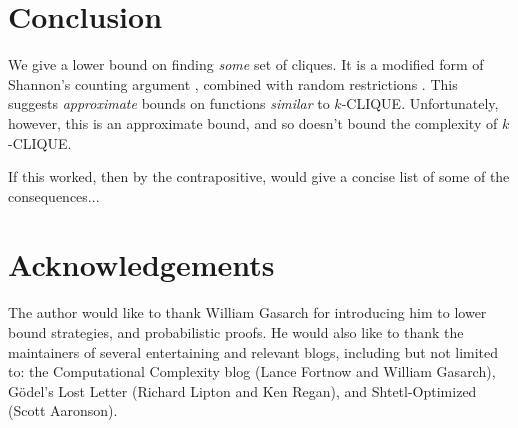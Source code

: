 \documentclass[12pt]{article}
\theoremstyle{definition}
\begin{document}
\section{Conclusion}

We give a lower bound on finding {\em some} set of cliques.
It is a modified form of Shannon's counting argument
\cite{shannon_synthesis_1949}, combined with random restrictions
\cite{subbotovskaya1963comparison} \cite{hastad1987lower}.
This suggests {\em approximate} bounds on functions {\em similar} to $k$-CLIQUE.
Unfortunately, however, this is an approximate bound,
and so doesn't bound the complexity of $k$-CLIQUE.

If this worked, then by the contrapositive,
\cite{fenner1996complexity} would give a concise list of some of the consequences...

\section{Acknowledgements}

The author would like to thank William Gasarch for introducing him
to lower bound strategies, and probabilistic proofs.
He would also like to thank the maintainers of
several entertaining and relevant blogs, including but
not limited to: the Computational Complexity blog
(Lance Fortnow and William Gasarch), 
G\"odel's Lost Letter (Richard Lipton and Ken Regan),
and Shtetl-Optimized (Scott Aaronson). 



\end{document}
